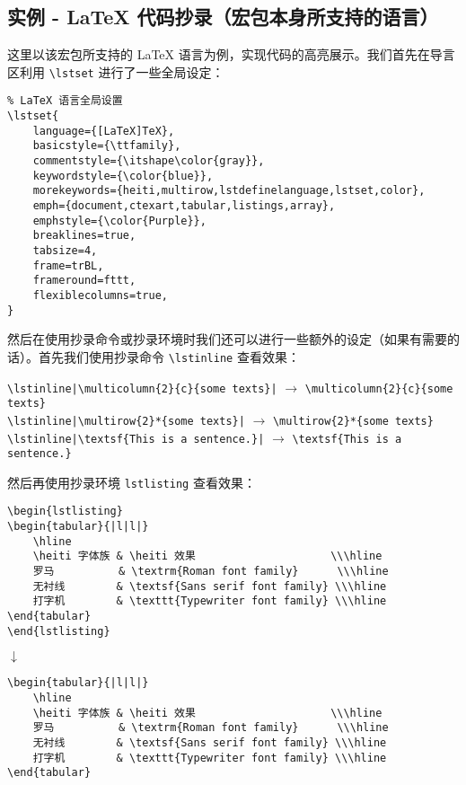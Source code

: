 \documentclass[UTF8,hyperref]{ctexart}
\begin{document}
\subsection{实例 - LaTeX 代码抄录（宏包本身所支持的语言）}
这里以该宏包所支持的 LaTeX 语言为例，实现代码的高亮展示。我们首先在导言区利用 \verb|\lstset| 进行了一些全局设定：
\begin{verbatim}
% LaTeX 语言全局设置
\lstset{
    language={[LaTeX]TeX},
    basicstyle={\ttfamily},
    commentstyle={\itshape\color{gray}},
    keywordstyle={\color{blue}},
    morekeywords={heiti,multirow,lstdefinelanguage,lstset,color},
    emph={document,ctexart,tabular,listings,array},
    emphstyle={\color{Purple}},
    breaklines=true,
    tabsize=4,
    frame=trBL,
    frameround=fttt,
    flexiblecolumns=true,
}
\end{verbatim}
然后在使用抄录命令或抄录环境时我们还可以进行一些额外的设定（如果有需要的话）。首先我们使用抄录命令 \verb|\lstinline| 查看效果：
\begin{flushleft}
\verb!\lstinline|\multicolumn{2}{c}{some texts}|! $\rightarrow$ \lstinline|\multicolumn{2}{c}{some texts}| \\
\verb!\lstinline|\multirow{2}*{some texts}|! $\rightarrow$ \lstinline|\multirow{2}*{some texts}| \\
\verb!\lstinline|\textsf{This is a sentence.}|! $\rightarrow$ \lstinline|\textsf{This is a sentence.}|
\end{flushleft}
然后再使用抄录环境 \verb|lstlisting| 查看效果：
\begin{center}
\begin{verbatim}
\begin{lstlisting}
\begin{tabular}{|l|l|}
    \hline
    \heiti 字体族 & \heiti 效果                     \\\hline
    罗马          & \textrm{Roman font family}      \\\hline
    无衬线        & \textsf{Sans serif font family} \\\hline
    打字机        & \texttt{Typewriter font family} \\\hline
\end{tabular}
\end{lstlisting}
\end{verbatim}
$\downarrow$ \\[0.25em]
\begin{lstlisting}
\begin{tabular}{|l|l|}
	\hline
	\heiti 字体族 & \heiti 效果                     \\\hline
	罗马          & \textrm{Roman font family}      \\\hline
	无衬线        & \textsf{Sans serif font family} \\\hline
	打字机        & \texttt{Typewriter font family} \\\hline
\end{tabular}
\end{lstlisting}
\end{center}
\end{document}
